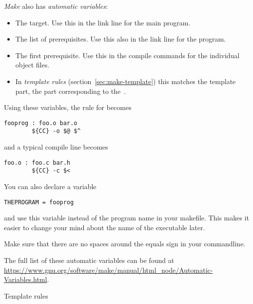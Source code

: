\emph{Make} also has \emph{automatic variables}:
\begin{itemize}
\item [\n{\$@}] The target. Use this in the link line for the main
  program. %
\item [\n{\$\char`\^}] The list of prerequisites. Use this also in the link
  line for the program.
\item [\n{\$<}] The first prerequisite. Use this in the compile
  commands for the individual object files.
\item [\n{\$*}] In \emph{template rules}
  (section~\ref{sec:make-template}) this matches the template part,
  the part corresponding to the~.
\end{itemize}
Using these variables, the rule for  becomes
\begin{lstlisting}
fooprog : foo.o bar.o
        ${CC} -o $@ $^
\end{lstlisting}
and a typical compile line becomes
\begin{lstlisting}
foo.o : foo.c bar.h
        ${CC} -c $<
\end{lstlisting}

You can also declare a variable
\begin{lstlisting}
THEPROGRAM = fooprog
\end{lstlisting}
and use this variable instead of the program name in your
makefile. This makes it easier to change your mind about the name of
the executable later. 

  {Make sure that there are no spaces
  around the equals sign in your commandline.}

The full list of these automatic variables can be found at
\url{https://www.gnu.org/software/make/manual/html_node/Automatic-Variables.html}.

 {Template rules}
\label{sec:make-template}

